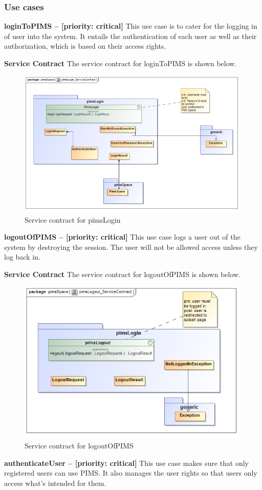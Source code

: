 \subsubsection{Use cases}
\begin{description}
	\item{\textbf{loginToPIMS -- [priority: critical] }}
	This use case is to cater for the logging in of user into the system. It entails the authentication of each user as well as their authorization, which is based on their access rights.
	\begin{description}
	\item{\textbf{Service Contract}} The service contract for loginToPIMS is shown below.
		\begin{figure}[H]
			\centerline{\includegraphics[width=0.7\linewidth]{./Functional_Requirements/Graphics/pimsLogin/pimsLogin_ServiceContract}}
			\caption{Service contract for pimsLogin}
		\end{figure}
	\end{description}
	\item{\textbf{logoutOfPIMS -- [priority: critical]}}
	This use case logs a user out of the system by destroying the session. The user will not be allowed access unless they log back in.
	\begin{description}
	\item{\textbf{Service Contract}} The service contract for logoutOfPIMS is shown below.
		\begin{figure}[H]
			\centerline{\includegraphics[width=0.7\linewidth]{./Functional_Requirements/Graphics/pimsLogin/pimsLogout_ServiceContract}}
			\caption{Service contract for logoutOfPIMS }
		\end{figure}
	\end{description}
	
		\item{\textbf{authenticateUser -- [priority: critical]}}
	This use case makes sure that only registered users can use PIMS. It also manages the user rights so that users only access what's intended for them.
\end{description}